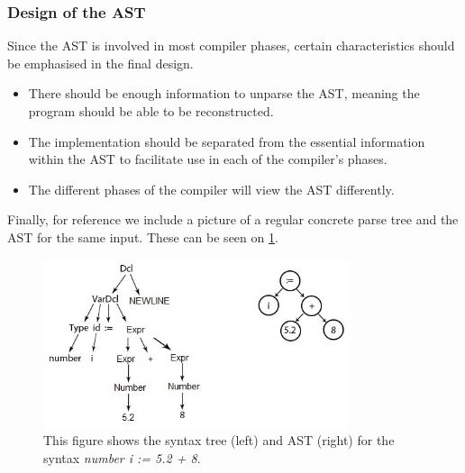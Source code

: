 \subsubsection{Design of the AST}
Since the AST is involved in most compiler phases, certain characteristics should be emphasised in the final design.

\begin{itemize}
    \item There should be enough information to unparse the AST, meaning the program should be able to be reconstructed.
    \item The implementation should be separated from the essential information within the AST to facilitate use in each of the compiler's phases.
    \item The different phases of the compiler will view the AST differently.
\end{itemize}
Finally, for reference we include a picture of a regular concrete parse tree and the AST for the same input. These can be seen on \ref{fig:syntax-AST}.

\begin{figure}[H]
\centering
  \includegraphics[width=0.8\textwidth]{figures/Syntax-AST.jpg}
  \caption{This figure shows the syntax tree (left) and AST (right) for the syntax \textit{number i := 5.2 + 8}.}
  \label{fig:syntax-AST}
\end{figure}


